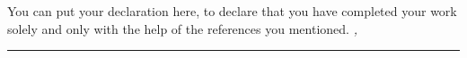 \label{sec:declaration}
\thispagestyle{empty}
%
You can put your declaration here, to declare that you have completed your work solely and only with the help of the references you mentioned.
%
\bigskip
%
\noindent\textit{\thesisUniversityCity, \thesisDate}
%
\smallskip
%
\begin{flushright}
	\begin{minipage}{5cm}
		\rule{\textwidth}{1pt}
		\centering\thesisName
	\end{minipage}
\end{flushright}
%
